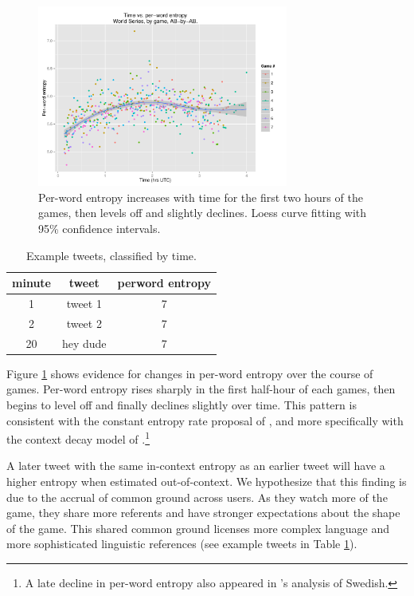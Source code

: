 \documentclass[11pt,letterpaper]{article}
\begin{document}
\begin{figure}
 \centering
  \includegraphics[width=3.25in]{figures/time-perword-ent-agg}
 \caption{Per-word entropy increases with time for the first two hours of the games, then levels off and slightly declines. Loess curve fitting with 95\% confidence intervals.}\label{fig:time-perword-ent}\vspace*{-.5em}
\end{figure}

\begin{table}
  \begin{tabular}{ccc}
minute & tweet & perword entropy \\
\hline
1 & tweet 1 & 7\\
2 & tweet 2 & 7\\
20 & hey dude & 7\\
\hline
  \end{tabular}
 \caption{Example tweets, classified by time.}\label{tab:ex}
\end{table}

Figure \ref{fig:time-perword-ent} shows evidence for changes in per-word entropy over the course of games. 
Per-word entropy rises sharply in the first half-hour of each games, then begins to level off and finally declines slightly over time.  This pattern is consistent with the constant entropy rate proposal of \cite{genzel2002}, and more specifically with the context decay model of \cite{qian2012}.\footnote{A late decline in per-word entropy also appeared in \cite{qian2012}'s analysis of Swedish.}  

A later tweet with the same in-context entropy as an earlier tweet will have a higher entropy when estimated out-of-context. We hypothesize that this finding is due to the accrual of common ground across users. As they watch more of the game, they share more referents and have stronger expectations about the shape of the game. This shared common ground licenses more complex language and more sophisticated linguistic references (see example tweets in Table \ref{tab:ex}). 
\end{document}
